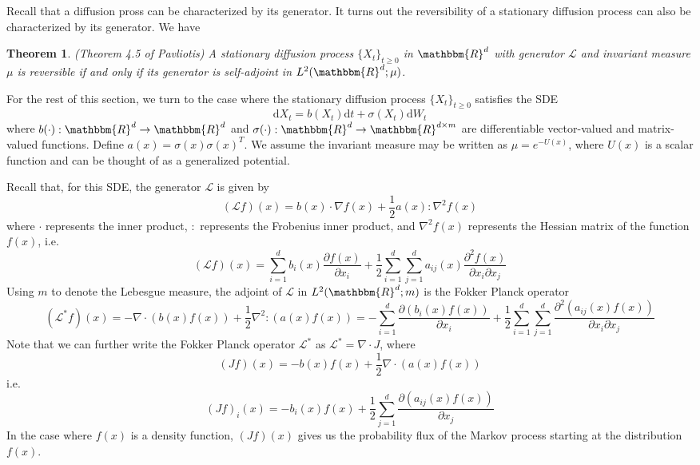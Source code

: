\documentclass[english, aip, jcp, priprint, graphicx,floatfix]{revtex4-1}
\newtheorem{theorem}{Theorem}
\theoremstyle{plain}
\theoremstyle{definition}
\theoremstyle{plain}
\begin{document}
Recall that a diffusion pross can be characterized by its generator. It turns
out the reversibility of a stationary diffusion process can also be
characterized by its generator. We have

\begin{theorem}
\label{thm:reversibility}(Theorem 4.5 of Pavliotis\cite{Pavliotis2016-xn}) A
stationary diffusion process $\{X_t\}_{t \geqslant 0}$ in $\mathbbm{R}^d$ with generator
$\mathcal{L}$ and invariant measure ${\mu}$ is reversible if and only if
its generator is self-adjoint in $L^2 (\mathbbm{R}^d ; {\mu})$.
\end{theorem}

For the rest of this section, we turn to the case where the stationary
diffusion process $\{X_t\}_{t \geqslant 0}$ satisfies the SDE
\[ \mathrm{d} X_t = b (X_t) \mathrm{d} t + \sigma (X_t) \mathrm{d} W_t \]
where $b (\cdot) : \mathbbm{R}^d \rightarrow \mathbbm{R}^d$ and $\sigma
(\cdot) : \mathbbm{R}^d \rightarrow \mathbbm{R}^{d \times m}$ are
differentiable vector-valued and matrix-valued functions. Define $a (x) =
\sigma (x) \sigma (x)^T$. We assume the invariant measure may be written as
${\mu}= e^{- U (x)}$, where $U (x)$ is a scalar function and can be
thought of as a generalized potential.

Recall that, for this SDE, the generator $\mathcal{L}$ is given by
\[ (\mathcal{L} f) (x) = b (x) \cdot \nabla f (x) + \frac{1}{2} a (x) :
\nabla^2 f (x) \]
where $\cdot$ represents the inner product, $:$ represents the Frobenius inner
product, and $\nabla^2 f (x)$ represents the Hessian matrix of the function $f
(x)$, i.e.
\[ (\mathcal{L} f) (x) = \sum_{i = 1}^d b_i (x) \frac{\partial f
(x)}{\partial x_i} + \frac{1}{2} \sum_{i = 1}^d \sum_{j = 1}^d a_{ij} (x)
\frac{\partial^2 f (x)}{\partial x_i \partial x_j} \]
Using $m$ to denote the Lebesgue measure, the adjoint of $\mathcal{L}$ in $L^2
(\mathbbm{R}^d ; m)$ is the Fokker Planck operator
\[ (\mathcal{L}^{\ast} f) (x) = - \nabla \cdot (b (x) f (x)) + \frac{1}{2}
\nabla^2 : (a (x) f (x)) = - \sum_{i = 1}^d \frac{\partial (b_i (x) f
(x))}{\partial x_i} + \frac{1}{2} \sum_{i = 1}^d \sum_{j = 1}^d
\frac{\partial^2 (a_{ij} (x) f (x))}{\partial x_i \partial x_j} \]
Note that we can further write the Fokker Planck operator $\mathcal{L}^{\ast}$
as $\mathcal{L}^{\ast} = \nabla \cdot J$, where
\[ (J f) (x) = - b (x) f (x) + \frac{1}{2} \nabla \cdot (a (x) f (x)) \]
i.e.
\[ (J f)_i (x) = - b_i (x) f (x) + \frac{1}{2} \sum_{j = 1}^d \frac{\partial
(a_{ij} (x) f (x))}{\partial x_j} \]
In the case where $f (x)$ is a density function, $(J f) (x)$ gives us the
probability flux of the Markov process starting at the distribution $f (x)$.
\end{document}
